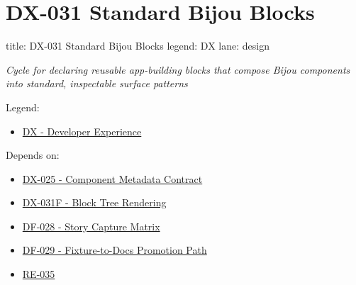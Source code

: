 \chapter{DX-031 Standard Bijou Blocks}\label{record-128}

\smallskip

\begin{RecordMeta}
title: DX-031 Standard Bijou Blocks
legend: DX
lane: design

\end{RecordMeta}

\emph{Cycle for declaring reusable app-building blocks that compose Bijou components into standard, inspectable surface patterns}

Legend:

\begin{itemize}
\tightlist
\item
  \href{https://github.com/flyingrobots/bijou/blob/1853ad902f6bf219326409e7f743a5a1d6517dbc/docs/legends/DX-developer-experience.md}{DX - Developer Experience}
\end{itemize}

Depends on:

\begin{itemize}
\tightlist
\item
  \href{https://github.com/flyingrobots/bijou/blob/cbd70612140e7a450d764b3c7be1c6af878b99bc/docs/design/DX-025-component-metadata-contract.md}{DX-025 - Component Metadata Contract}
\item
  \href{https://github.com/flyingrobots/bijou/blob/cbd70612140e7a450d764b3c7be1c6af878b99bc/docs/design/DX-031F-block-tree-rendering.md}{DX-031F - Block Tree Rendering}
\item
  \href{https://github.com/flyingrobots/bijou/blob/cbd70612140e7a450d764b3c7be1c6af878b99bc/docs/design/DF-028-story-capture-matrix.md}{DF-028 - Story Capture Matrix}
\item
  \href{https://github.com/flyingrobots/bijou/blob/cbd70612140e7a450d764b3c7be1c6af878b99bc/docs/design/DF-029-fixture-to-docs-promotion-path.md}{DF-029 - Fixture-to-Docs Promotion Path}
\item
  \href{https://github.com/flyingrobots/bijou/blob/cbd70612140e7a450d764b3c7be1c6af878b99bc/docs/design/RE-035-mandatory-layout-envelope-and-constraint-negotiation.md}{RE-035}
\end{itemize}


